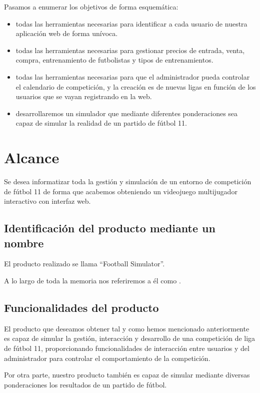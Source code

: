Pasamos a enumerar los objetivos de forma esquemática:

\begin{itemize}
\item {} todas las herramientas necesarias para
  identificar a cada usuario de nuestra aplicación web de forma unívoca.
\item {} todas las herramientas necesarias para
  gestionar precios de entrada, venta, compra, entrenamiento de futbolistas y
  tipos de entrenamientos.
\item {} todas las herramientas necesarias para
  que el administrador pueda controlar el calendario de competición, y la
  creación es de nuevas ligas en función de los usuarios que se vayan
  registrando en la web.
\item {} desarrollaremos un simulador que
  mediante diferentes ponderaciones sea capaz de simular la realidad de un
  partido de fútbol 11.
\end{itemize}

\section{Alcance}
Se desea informatizar toda la gestión y simulación de un entorno de competición
de fútbol 11 de forma que acabemos obteniendo un videojuego multijugador
interactivo con interfaz web.

\subsection{Identificación del producto mediante un nombre}
El producto realizado se llama ``Football Simulator''.

A lo largo de toda la memoria nos referiremos a él como
.

\subsection{Funcionalidades del producto}
El producto que deseamos obtener tal y como hemos mencionado anteriormente es
capaz de simular la gestión, interacción y desarrollo de una competición de liga
de fútbol 11, proporcionando funcionalidades de interacción entre usuarios y del
administrador para controlar el comportamiento de la competición.

Por otra parte, nuestro producto también es capaz de simular mediante diversas
ponderaciones los resultados de un partido de fútbol.

